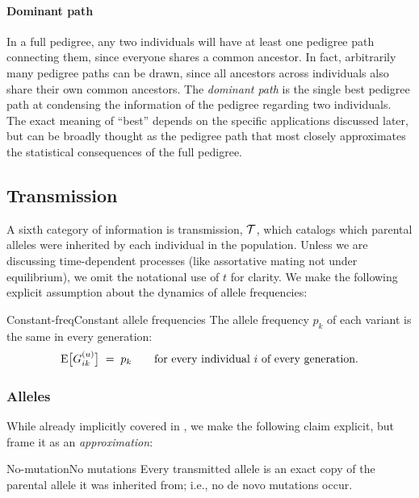 \documentclass[12pt]{article}
\numberwithin{equation}{section}
\begin{document}
\paragraph{Dominant path} In a full pedigree, any two individuals will have at least one pedigree path connecting them, since everyone shares a common ancestor.
In fact, arbitrarily many pedigree paths can be drawn, since all ancestors across individuals also share their own common ancestors.
The \emph{dominant path} is the single best pedigree path at condensing the information of the pedigree regarding two individuals.
The exact meaning of ``best'' depends on the specific applications discussed later, but can be broadly thought as the pedigree path that most closely approximates the statistical consequences of the full pedigree.

\subsection{Transmission}\label{sec:transmission}
A sixth category of information is transmission, $\mathcal{T}$, which catalogs which parental alleles were inherited by each individual in the population.
Unless we are discussing time-dependent processes (like assortative mating not under equilibrium), we omit the notational use of $t$ for clarity.
We make the following explicit assumption about the dynamics of allele frequencies:
\begin{assumption}{Constant-freq}{Constant allele frequencies}
The allele frequency $p_k$ of each variant is the same in every generation:
$$ \mathrm{E}\big[G_{ik}^{(u)}\big] \;=\; p_k \qquad \text{for every individual } i \text{ of every generation} . $$
\end{assumption}

\subsubsection{Alleles}\label{sec:transmission-alleles}
While already implicitly covered in , we make the following claim explicit, but frame it as an \emph{approximation}:

\begin{approximation}{No-mutation}{No mutations}
Every transmitted allele is an exact copy of the parental allele it was inherited from; 
i.e., no de novo mutations occur.
\end{approximation}
\end{document}
